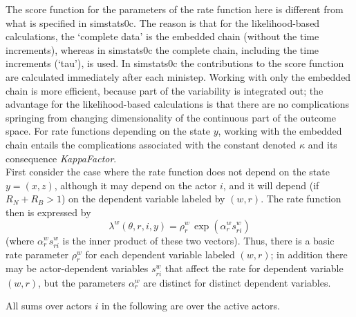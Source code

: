 \documentclass[a4paper,12pt,fleqn]{article}
\begin{document}
The score function for the parameters of the rate function
here is different from what is specified in
\textsf{simstats0c}.
The reason is that for the likelihood-based calculations,
the `complete data' is the embedded chain (without the time increments),
whereas in  \textsf{simstats0c}
the complete chain, including the time increments (`tau'), is used.
In \textsf{simstats0c} the contributions to the score function
are calculated immediately after each ministep.
Working with only the embedded chain is more efficient, because part
of the variability is integrated out; the advantage for the
likelihood-based calculations is that there are no complications springing
from changing dimensionality of the continuous part of the outcome space.
For rate functions depending on the state $y$, working with the
embedded chain entails the complications associated with the constant denoted $\kappa$
and its consequence \textit{KappaFactor}.
\bigskip
\\
\hspace*{\parindent}
First consider the case where the rate function does not depend on the
state $y = (x,z)$, although it may depend on the actor $i$,
and it will depend  (if $R_N + R_B > 1$) on the dependent variable labeled by $(w,r)$.
The rate function then is expressed by
\begin{equation}
 \lambda^w(\theta, r,i, y) = \rho^w_r \, \exp(\alpha^w_{r} s^w_{ri} )
               \label{tkappa5}
\end{equation}
(where $\alpha^w_{r} s^w_{ri}$ is the inner product of these two vectors).
Thus, there is a basic rate parameter $\rho^w_r$ for each  dependent
variable labeled $(w,r)$; in addition there may be actor-dependent variables $s^w_{ri}$ that
affect the rate for dependent variable $(w,r)$, but the parameters $\alpha^w_{r}$
are distinct for distinct dependent variables.

All sums over actors $i$ in the following are over the active actors.
\end{document}
